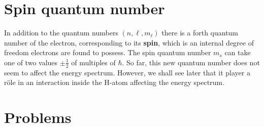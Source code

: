 \section{ Spin quantum number}
In addition to the quantum numbers $( n, \ell, m_\ell)$ there is a forth quantum number of the electron, corresponding to its \textbf{spin}, which is an internal degree of freedom electrons are found to possess. The spin quantum number $ m_s$ can take one of two values $ \pm \frac{1}{2}$ of multiples of $\hbar$. So far, this new quantum number does not seem to affect the energy spectrum. However, we shall see later that it player a r\"{o}le in an interaction inside the H-atom affecting the energy spectrum.
\section{Problems}
